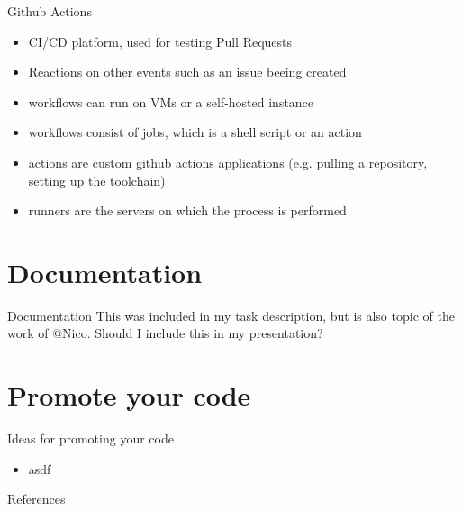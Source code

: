 \documentclass[compress,aspectratio=169]{beamer}
\begin{document}
		\begin{frame}{Github Actions}
			\begin{itemize}
				\item 	CI/CD platform, used for testing Pull Requests
				\item 	Reactions on other events such as an issue beeing created
				\item 	workflows can run on VMs or a self-hosted instance
				\item 	workflows consist of jobs, which is a shell script or an action
				\item 	actions are custom github actions applications (e.g. pulling a repository, setting up the toolchain) 
				\item 	runners are the servers on which the process is performed
			\end{itemize}
		\end{frame}
		
	\section{Documentation}
		\begin{frame}{Documentation}
			This was included in my task description, but is also topic of the work of @Nico. Should I include this in my presentation?
		
		\end{frame}
	
	\section{Promote your code}
	
		\begin{frame}{Ideas for promoting your code}
		
			\begin{itemize}
				\item asdf
			
			\end{itemize}
			
		\end{frame}
	
		
		\begin{frame}{References}
			\renewcommand*{\bibfont}{\normalfont\scriptsize}
			\printbibliography[heading=none]
			\label{pg:lastpage} %
		\end{frame}
\end{document}
